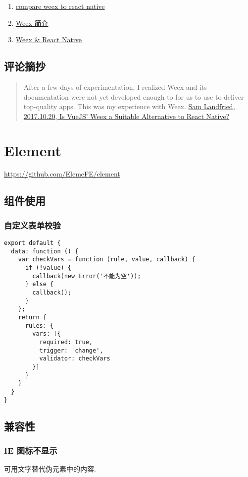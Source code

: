 \begin{enumerate}
\def\labelenumi{\arabic{enumi}.}
\tightlist
\item
  \href{https://www.gitbook.com/book/xiaomaer/compare-weex-to-react-native/details}{compare
  weex to react native}
\item
  \href{http://slides.com/ciyinhuang/weex\#/}{Weex 简介}
\item
  \href{http://zfx5130.me/blog/2016/09/15/Weex-\&-React-Native/}{Weex \&
  React Native}
\end{enumerate}

\subsection{评论摘抄}\label{ux8bc4ux8bbaux6458ux6284}

\begin{quote}
After a few days of experimentation, I realized Weex and its
documentation were not yet developed enough to for us to use to deliver
top-quality apps. This was my experience with Weex.
\href{https://www.bignerdranch.com/blog/is-vuejs-weex-a-suitable-alternative-to-react-native/}{Sam
Landfried, 2017.10.20, Is VueJS' Weex a Suitable Alternative to React
Native?}
\end{quote}

\section{Element}\label{element}

\url{https://github.com/ElemeFE/element}

\subsection{组件使用}\label{ux7ec4ux4ef6ux4f7fux7528}

\subsubsection{自定义表单校验}\label{ux81eaux5b9aux4e49ux8868ux5355ux6821ux9a8c}

\begin{lstlisting}
export default {
  data: function () {
    var checkVars = function (rule, value, callback) {
      if (!value) {
        callback(new Error('不能为空'));
      } else {
        callback();
      }
    };
    return {
      rules: {
        vars: [{
          required: true,
          trigger: 'change',
          validator: checkVars
        }]
      }
    }
  }
}
\end{lstlisting}

\subsection{兼容性}\label{ux517cux5bb9ux6027}

\subsubsection{IE 图标不显示}\label{ie-ux56feux6807ux4e0dux663eux793a}

可用文字替代伪元素中的内容.
